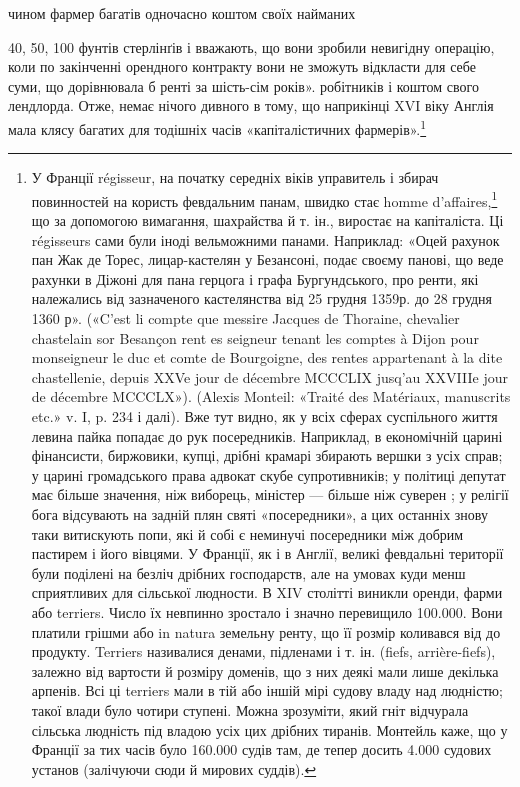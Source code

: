 чином фармер багатів одночасно коштом своїх найманих

40, 50, 100 фунтів стерлінґів і вважають, що вони зробили невигідну операцію,
коли по закінченні орендного контракту вони не зможуть відкласти
для себе суми, що дорівнювала б ренті за шість-сім років».
робітників і коштом свого лендлорда. Отже, немає нічого дивного
в тому, що наприкінці XVI віку Англія мала клясу багатих
для тодішніх часів «капіталістичних фармерів».\footnote{
У Франції régisseur, на початку середніх віків управитель і збирач
повинностей на користь февдальним панам, швидко стає homme
d’affaires,\footnote*{
— ділком. \emph{Ред.}
} що за допомогою вимагання, шахрайства й т. ін., виростає
на капіталіста. Ці régisseurs сами були іноді вельможними панами. Наприклад:
«Оцей рахунок пан Жак де Торес, лицар-кастелян у
Безансоні, подає своєму панові, що веде рахунки в Діжоні для пана
герцога і графа Бургундського, про ренти, які належались від зазначеного
кастелянства від 25 грудня 1359р. до 28 грудня 1360 р». («C’est
li compte que messire Jacques de Thoraine, chevalier chastelain sor Besançon
rent es seigneur tenant les comptes à Dijon pour monseigneur le
duc et comte de Bourgoigne, des rentes appartenant à la dite chastellenie,
depuis XXVe jour de décembre MCCCLIX jusq’au XXVIIIe jour de décembre
MCCCLX»). (Alexis Monteil: «Traité des Matériaux, manuscrits etc.» v. I,
p. 234 і далі). Вже тут видно, як у всіх сферах суспільного життя левина
пайка попадає до рук посередників. Наприклад, в економічній царині фінансисти,
биржовики, купці, дрібні крамарі збирають вершки з усіх справ;
у царині громадського права адвокат скубе супротивників; у політиці
депутат має більше значення, ніж виборець, міністер — більше ніж суверен
; у релігії бога відсувають на задній плян святі «посередники», а цих
останніх знову таки витискують попи, які й собі є неминучі посередники
між добрим пастирем і його вівцями. У Франції, як і в Англії, великі
февдальні території були поділені на безліч дрібних господарств, але
на умовах куди менш сприятливих для сільської людности. В XIV столітті
виникли оренди, фарми або terriers. Число їх невпинно зростало і
значно перевищило 100.000. Вони платили грішми або in natura земельну
ренту, що її розмір коливався від  до  продукту. Terriers називалися
денами, підленами і т. ін. (fiefs, arrière-fiefs), залежно від вартости й
розміру доменів, що з них деякі мали лише декілька арпенів. Всі ці
terriers мали в тій або іншій мірі судову владу над людністю; такої влади
було чотири ступені. Можна зрозуміти, який гніт відчурала сільська
людність під владою усіх цих дрібних тиранів. Монтейль каже, що у Франції
за тих часів було 160.000 судів там, де тепер досить 4.000 судових установ
(залічуючи сюди й мирових суддів).
}

